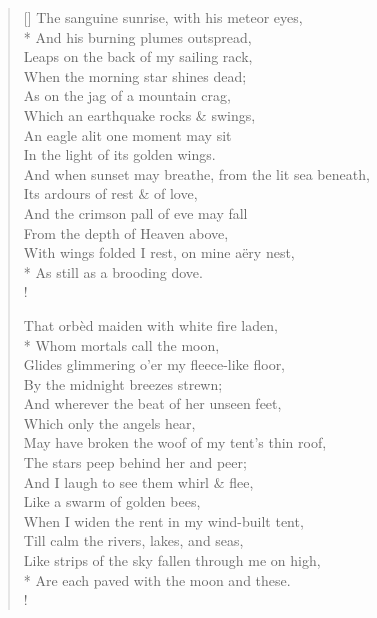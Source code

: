 \documentclass[MAIN]{subfiles}
\begin{document}
\begin{verse}[\versewidth]
The sanguine sunrise, with his meteor eyes,\\*
\vin And his burning plumes outspread,\\
Leaps on the back of my sailing rack,\\
\vin When the morning star shines dead;\\
As on the jag of a mountain crag,\\
\vin Which an earthquake rocks \& swings,\\
An eagle alit one moment may sit\\
\vin In the light of its golden wings.\\
And when sunset may breathe, from the lit sea beneath,\\
\vin Its ardours of rest \& of love,\\
And the crimson pall of eve may fall\\
\vin From the depth of Heaven above,\\
With wings folded I rest, on mine a\"ery nest,\\*
\vin As still as a brooding dove.\\!

That orb\`ed maiden with white fire laden,\\*
\vin Whom mortals call the moon,\\
Glides glimmering o'er my fleece-like floor,\\
\vin By the midnight breezes strewn;\\
And wherever the beat of her unseen feet,\\
\vin Which only the angels hear,\\
May have broken the woof of my tent's thin roof,\\
\vin The stars peep behind her and peer;\\
And I laugh to see them whirl \& flee,\\
\vin Like a swarm of golden bees,\\
When I widen the rent in my wind-built tent,\\
\vin Till calm the rivers, lakes, and seas,\\
Like strips of the sky fallen through me on high,\\*
\vin Are each paved with the moon and these.\\!


\end{verse}
\end{document}

